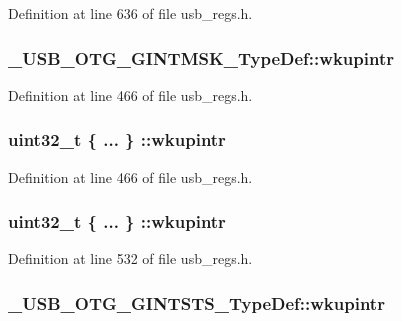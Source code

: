Definition at line 636 of file usb\-\_\-regs.\-h.

\hypertarget{group___u_s_b___o_t_g___d_r_i_v_e_r_ga10f52c46665ba27efd6a1ef98cb58fd7}{
\subsubsection[{wkupintr}]{ \-\_\-\-U\-S\-B\-\_\-\-O\-T\-G\-\_\-\-G\-I\-N\-T\-M\-S\-K\-\_\-\-Type\-Def\-::wkupintr}}\label{group___u_s_b___o_t_g___d_r_i_v_e_r_ga10f52c46665ba27efd6a1ef98cb58fd7}


Definition at line 466 of file usb\-\_\-regs.\-h.

\hypertarget{group___u_s_b___o_t_g___d_r_i_v_e_r_gaf08bea9bfbcff76f641ac5395427ef52}{
\subsubsection[{wkupintr}]{\setlength{\rightskip}{0pt plus 5cm}uint32\-\_\-t \{ ... \} \-::wkupintr}}\label{group___u_s_b___o_t_g___d_r_i_v_e_r_gaf08bea9bfbcff76f641ac5395427ef52}


Definition at line 466 of file usb\-\_\-regs.\-h.

\hypertarget{group___u_s_b___o_t_g___d_r_i_v_e_r_ga5e81b763f4b72d4f52576f3831bdd221}{
\subsubsection[{wkupintr}]{\setlength{\rightskip}{0pt plus 5cm}uint32\-\_\-t \{ ... \} \-::wkupintr}}\label{group___u_s_b___o_t_g___d_r_i_v_e_r_ga5e81b763f4b72d4f52576f3831bdd221}


Definition at line 532 of file usb\-\_\-regs.\-h.

\hypertarget{group___u_s_b___o_t_g___d_r_i_v_e_r_gab4bdf68468fff59d9d9e808148a9638d}{
\subsubsection[{wkupintr}]{ \-\_\-\-U\-S\-B\-\_\-\-O\-T\-G\-\_\-\-G\-I\-N\-T\-S\-T\-S\-\_\-\-Type\-Def\-::wkupintr}}\label{group___u_s_b___o_t_g___d_r_i_v_e_r_gab4bdf68468fff59d9d9e808148a9638d}



